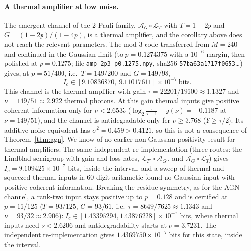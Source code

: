 \documentclass[aps,pra,reprint,superscriptaddress,nofootinbib,longbibliography,floatfix]{revtex4-2}
\theoremstyle{remark}
\newcommand{\Ic}{I_c}
\newcommand{\Amp}{\mathcal{A}}
\newcommand{\Loss}{\mathcal{L}}
\begin{document}
\paragraph*{A thermal amplifier at low noise.} The emergent channel of the 2-Pauli family,
$\Amp_G\circ\Loss_T$ with $T=1-2p$ and $G=(1-2p)/(1-4p)$, is a thermal amplifier, and the corollary above
does not reach the relevant parameters. The mod-3 code transferred from $M=240$ and continued in the
Gaussian limit (to $p=0.1274375$ with a $10^{-6}$ margin, then polished at $p=0.1275$; file \texttt{amp\_2p3\_p0.1275.npy}, sha256 \texttt{57ba63a1717f0653}\dots)
gives, at $p=51/400$, i.e.\ $T=149/200$ and $G=149/98$,
\begin{equation}
  \Ic\in[9.10836870,\ 9.11017611]\times10^{-7}\ \text{bits}.
\end{equation}
This channel is the thermal amplifier with gain $\tau=22201/19600\approx1.1327$ and $\nu=149/51\approx2.922$
thermal photons. At this gain thermal inputs give positive coherent information only for $\nu<2.6533$
($\log_2\frac{\tau}{\tau-1}-g(\nu)=-0.1187$ at $\nu=149/51$), and the channel is antidegradable only for
$\nu\ge3.768$ ($Y\ge\tau/2$). Its additive-noise equivalent has $\sigma^2=0.459>0.4121$, so this is not a
consequence of Theorem~\ref{thm:agn}. We know of no earlier non-Gaussian positivity result for thermal
amplifiers. The same independent re-implementation (three routes: the Lindblad semigroup with gain and loss
rates, $\Loss_{T'}\circ\Amp_{G'}$, and $\Amp_G\circ\Loss_T$) gives $\Ic=9.109425\times10^{-7}$ bits, inside
the interval, and a sweep of thermal and squeezed-thermal inputs in 60-digit arithmetic found no Gaussian
input with positive coherent information. Breaking the residue symmetry, as for the AGN channel, a
rank-two input stays positive up to $p=0.128$ and is certified at $p=16/125$ ($T=93/125$, $G=93/61$, i.e.\
$\tau=8649/7625\approx1.1343$ and $\nu=93/32\approx2.906$): $\Ic\in[1.43395294,1.43876228]\times10^{-7}$ bits,
where thermal inputs need $\nu<2.6206$ and antidegradability starts at $\nu=3.7231$. The independent re-implementation gives
$1.4369750\times10^{-7}$ bits for this state, inside the interval.
\end{document}

